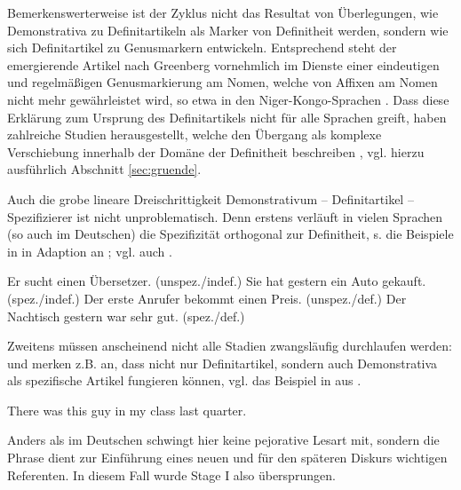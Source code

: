 Bemerkenswerterweise ist der Zyklus nicht das Resultat von Überlegungen, wie Demonstrativa zu Definitartikeln als Marker von Definitheit werden, sondern wie sich Definitartikel zu Genusmarkern entwickeln. Entsprechend steht der emergierende Artikel nach Greenberg vornehmlich im Dienste einer eindeutigen und regelmäßigen Genusmarkierung am Nomen, welche von Affixen am Nomen nicht mehr gewährleistet wird, so etwa in den Niger-Kongo-Sprachen \parencite[55, 62]{Greenberg1978}. Dass diese Erklärung zum Ursprung des Definitartikels nicht für alle Sprachen greift, haben zahlreiche Studien herausgestellt, welche den Übergang als komplexe Verschiebung innerhalb der Domäne der Definitheit beschreiben \parencite[z.B.][]{Himmelmann1997,Lyons1999,Leiss2000,Demske2001}, vgl. hierzu ausführlich Abschnitt \ref{sec:gruende}.

Auch die grobe lineare Dreischrittigkeit Demonstrativum -- Definitartikel -- Spezifizierer ist nicht unproblematisch. Denn erstens verläuft in vielen Sprachen (so auch im Deutschen) die Spezifizität orthogonal zur Definitheit, s. die Beispiele in  in Adaption an \textcite[245]{Studler2011}; vgl. auch \textcite{Lyons1999}. 

\begin{exe}
	\ex \label{ex:spez-ortho}   
	\begin{xlist}
		\ex \label{ex:kleid1} Er sucht einen Übersetzer.  (unspez./indef.) 
		\ex \label{ex:kleid2} Sie hat gestern ein Auto gekauft. (spez./indef.)
		\ex \label{ex:stud1} Der erste Anrufer bekommt einen Preis. (unspez./def.)
		\ex \label{ex:stud2} Der Nachtisch gestern war sehr gut. (spez./def.)
		\end{xlist}
\end{exe}

\noindent 
Zweitens müssen anscheinend nicht alle Stadien zwangsläufig durchlaufen werden: \textcite[107]{Himmelmann1997} und \textcite[139]{Diessel1999} merken z.B. an, dass nicht nur Definitartikel, sondern auch Demonstrativa als spezifische Artikel fungieren können, vgl. das Beispiel in  aus \textcite[533]{deMulder2011}. 
\begin{exe}
	\ex \label{ex:guy}   There was this guy in my class last quarter.
\end{exe}
\noindent 
Anders als im Deutschen schwingt hier keine pejorative Lesart mit, sondern die Phrase  dient zur Einführung eines neuen und für den späteren Diskurs wichtigen Referenten. In diesem Fall wurde Stage I also übersprungen. 

